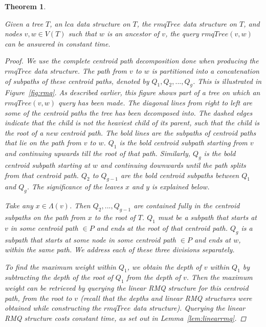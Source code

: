 \documentclass{article}
\newcommand{\leafset}{\Lambda}
\newtheorem{rmqquery}[incompatibility]{Theorem}
\begin{document}
    \medskip
    \begin{rmqquery}
        \label{lem:rmqquery}

        Given a tree $T$, an $lca$ data structure on $T$, the $rmqTree$ data structure on $T$, and nodes $v, w \in V(T)$ such that $w$ is an ancestor of $v$, the query $rmqTree(v, w)$ can be answered in constant time.

        \begin{proof}
            We use the complete centroid path decomposition done when producing the $rmqTree$ data structure. The path from $v$ to $w$ is partitioned into a concatenation of subpaths of these centroid paths, denoted by $Q_1, Q_2, ..., Q_g$. This is illustrated in Figure~\ref{fig:rmq}. As described earlier, this figure shows part of a tree on which an $rmqTree(v, w)$ query has been made. The diagonal lines from right to left are some of the centroid paths the tree has been decomposed into. The dashed edges indicate that the child is not the heaviest child of its parent, such that the child is the root of a new centroid path. The bold lines are the subpaths of centroid paths that lie on the path from $v$ to $w$. $Q_1$ is the bold centroid subpath starting from $v$ and continuing upwards till the root of that path. Similarly, $Q_g$ is the bold centroid subpath starting at $w$ and continuing downwards until the path splits from that centroid path. $Q_2$ to $Q_{g - 1}$ are the bold centroid subpaths between $Q_1$ and $Q_g$. The significance of the leaves $x$ and $y$ is explained below.

            Take any $x \in \leafset(v)$. Then $Q_2, ..., Q_{g - 1}$ are contained fully in the centroid subpaths on the path from $x$ to the root of $T$. $Q_1$ must be a subpath that starts at $v$ in some centroid path $\in P$ and ends at the root of that centroid path. $Q_g$ is a subpath that starts at some node in some centroid path $\in P$ and ends at $w$, within the same path. We address each of these three divisions separately.

            To find the maximum weight within $Q_1$, we obtain the depth of $v$ within $Q_1$ by subtracting the depth of the root of $Q_1$ from the depth of $v$. Then the maximum weight can be retrieved by querying the linear RMQ structure for this centroid path, from the root to $v$ (recall that the depths and linear RMQ structures were obtained while constructing the $rmqTree$ data structure). Querying the linear RMQ structure costs constant time, as set out in Lemma~\ref{lem:linearrmq}.


\end{proof}
\end{rmqquery}
\end{document}
